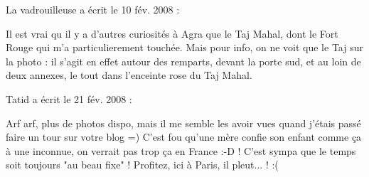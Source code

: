 \medskip
La vadrouilleuse a écrit le 10 fév. 2008 :
\begin{displayquote}
Il est vrai qu il y a d'autres curiosités à Agra que le Taj Mahal, dont le Fort Rouge qui m'a particulierement touchée. Mais pour info, on ne voit que le Taj sur la photo : il s'agit en effet autour des remparts, devant la porte sud, et au loin de deux annexes, le tout dans l'enceinte rose du Taj Mahal.
\end{displayquote}

\medskip
Tatid a écrit le 21 fév. 2008 :
\begin{displayquote}
Arf arf, plus de photos dispo, mais il me semble les avoir vues quand j'étais passé faire un tour sur votre blog =)
C'est fou qu'une mère confie son enfant comme ça à une inconnue, on verrait pas trop ça en France :-D ! C'est sympa que le temps soit toujours "au beau fixe" ! Profitez, ici à Paris, il pleut... ! :(
\end{displayquote}

\vfill
